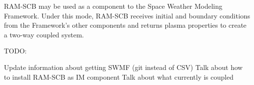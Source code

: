RAM-SCB may be used as a component to the Space Weather Modeling Framework. Under this mode, RAM-SCB receives initial and boundary conditions from the Framework's other components and returns plasma properties to create a two-way coupled system.

TODO:

Update information about getting SWMF (git instead of CSV)
Talk about how to install RAM-SCB as IM component
Talk about what currently is coupled

 



